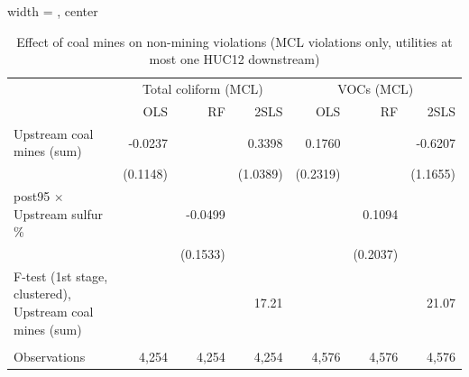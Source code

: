
\begin{table}[htbp]
   
   \caption{\label{2sls_dwnstrm_nonminevio_mcl_ivsum} Effect of coal mines on non-mining violations (MCL violations only, utilities at most one HUC12 downstream)}
   \bigskip
   
   \centering
   
   \begin{adjustbox}{width = \textwidth, center}
      
      
      \begin{tabular}{lrrrrrr}
         \toprule
         
          & \multicolumn{3}{c}{Total coliform (MCL)} & \multicolumn{3}{c}{VOCs (MCL)}\\
         
                                                                  & OLS      & RF       & 2SLS     & OLS      & RF       & 2SLS\\  
         
         \midrule 
         Upstream coal mines (sum)                                & -0.0237  &          & 0.3398   & 0.1760   &          & -0.6207\\   
                                                                  & (0.1148) &          & (1.0389) & (0.2319) &          & (1.1655)\\   
         post95 $\times$ Upstream sulfur \%                       &          & -0.0499  &          &          & 0.1094   &   \\   
                                                                  &          & (0.1533) &          &          & (0.2037) &   \\   
         
         F-test (1st stage, clustered), Upstream coal mines (sum) &          &          & 17.21    &          &          & 21.07\\  
         
          \\
         
         Observations                                             & 4,254    & 4,254    & 4,254    & 4,576    & 4,576    & 4,576\\  
         
         \bottomrule
         
      \end{tabular}
      

\end{adjustbox}
\end{table}
